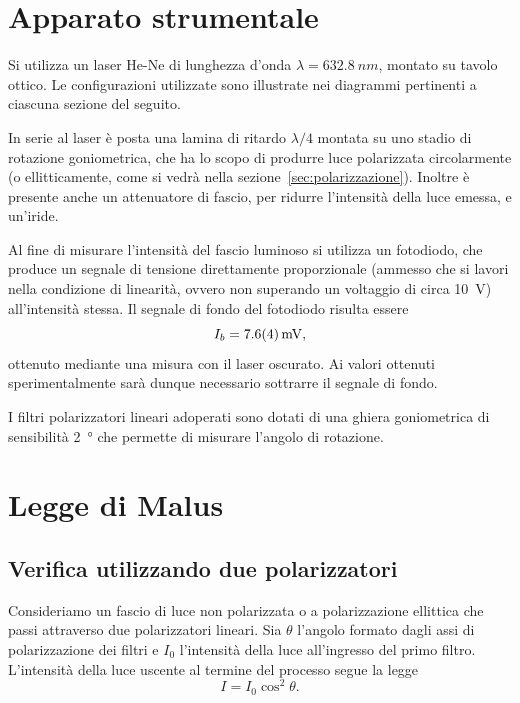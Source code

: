 \documentclass[10pt,oneside,a4paper]{article}
\begin{document}
\begin{multicols}{2}
\section{Apparato strumentale}

Si utilizza un laser He-Ne di lunghezza d'onda $\lambda = \SI{632.8}{nm}$, montato su tavolo ottico. Le configurazioni utilizzate sono illustrate nei diagrammi pertinenti a ciascuna sezione del seguito.

In serie al laser è posta una lamina di ritardo $\lambda / 4$ montata su uno stadio di rotazione goniometrica, che ha lo scopo di produrre luce polarizzata circolarmente (o ellitticamente, come si vedrà nella sezione~\ref{sec:polarizzazione}). Inoltre è presente anche un attenuatore di fascio, per ridurre l'intensità della luce emessa, e un'iride.

Al fine di misurare l'intensità del fascio luminoso si utilizza un fotodiodo, che produce un segnale di tensione direttamente proporzionale (ammesso che si lavori nella condizione di linearità, ovvero non superando un voltaggio di circa \SI{10}{V}) all'intensità stessa. Il segnale di fondo del fotodiodo risulta essere 
\[
I_b = \SI{7.6 \pm 0.4}{mV},
\]
ottenuto mediante una misura con il laser oscurato. Ai valori ottenuti sperimentalmente sarà dunque necessario sottrarre il segnale di fondo.

I filtri polarizzatori lineari adoperati sono dotati di una ghiera goniometrica di sensibilità \SI{2}{\degree} che permette di misurare l'angolo di rotazione.




\section{Legge di Malus}
\subsection{Verifica utilizzando due polarizzatori}

Consideriamo un fascio di luce non polarizzata o a polarizzazione ellittica che passi attraverso due polarizzatori lineari. Sia $\theta$ l'angolo formato dagli assi di polarizzazione dei filtri e $I_0$ l'intensità della luce all'ingresso del primo filtro. L'intensità della luce uscente al termine del processo segue la legge
\begin{equation}\label{eq:Malus1}
  I = I_0\cos^2\theta.
\end{equation}


\end{multicols}
\end{document}
